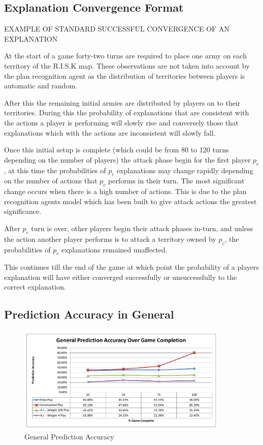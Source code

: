 \documentclass[parskip]{cs4rep}
\begin{document}
\subsection{Explanation Convergence Format}

EXAMPLE OF STANDARD SUCCESSFUL CONVERGENCE OF AN EXPLANATION

At the start of a game forty-two turns are required to place one army on each territory of the R.I.S.K map. These observations are not taken into account by the plan recognition agent as the distribution of territories between players is automatic and random. 

After this the remaining initial armies are distributed by players on to their territories. During this the probability of explanations that are consistent with the actions a player is performing will slowly rise and conversely those that explanations which with the actions are inconsistent will slowly fall.

Once this initial setup is complete (which could be from 80 to 120 turns depending on the number of players) the attack phase begin for the first player $p_c$, at this time the probabilities of $p_c$ explanations may change rapidly depending on the number of actions that $p_c$ performs in their turn. The most significant change occurs when there is a high number of actions. This is due to the plan recognition agents model which has been built to give attack actions the greatest significance.

After $p_c$ turn is over, other players begin their attack phases in-turn, and unless the action another player performs is to attack a territory owned by $p_c$, the probabilities of $p_c$ explanations remained unaffected. 

This continues till the end of the game at which point the probability of a players explanation will have either converged successfully or unsuccessfully to the correct explanation. 

\subsection{Prediction Accuracy in General}

\begin{figure}[h]
\centerline{
\includegraphics[width=0.9\textwidth]{images/general-game-complete.pdf}
}
\caption{General Prediction Accuracy}
\label{fig:dom-debug-gui}
\end{figure} 
\end{document}
